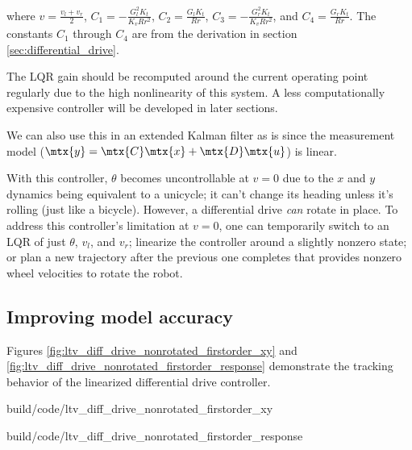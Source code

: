\begin{theorem}
  where $v = \frac{v_l + v_r}{2}$, $C_1 = -\frac{G_l^2 K_t}{K_v R r^2}$,
  $C_2 = \frac{G_l K_t}{Rr}$, $C_3 = -\frac{G_r^2 K_t}{K_v R r^2}$, and
  $C_4 = \frac{G_r K_t}{Rr}$. The constants $C_1$ through $C_4$ are from the
  derivation in section \ref{sec:differential_drive}.

  The LQR gain should be recomputed around the current operating point regularly
  due to the high nonlinearity of this system. A less computationally expensive
  controller will be developed in later sections.
\end{theorem}

We can also use this in an extended Kalman filter as is since the measurement
model ($\mtx{y} = \mtx{C}\mtx{x} + \mtx{D}\mtx{u}$) is linear.

With this \gls{controller}, $\theta$ becomes uncontrollable at $v = 0$ due to
the $x$ and $y$ dynamics being equivalent to a unicycle; it can't change its
heading unless it's rolling (just like a bicycle). However, a differential
drive \textit{can} rotate in place. To address this controller's limitation at
$v = 0$, one can temporarily switch to an LQR of just $\theta$, $v_l$, and
$v_r$; linearize the controller around a slightly nonzero state; or plan a new
trajectory after the previous one completes that provides nonzero wheel
velocities to rotate the robot.

\subsection{Improving model accuracy}

Figures \ref{fig:ltv_diff_drive_nonrotated_firstorder_xy} and
\ref{fig:ltv_diff_drive_nonrotated_firstorder_response} demonstrate the
tracking behavior of the linearized differential drive controller.

\begin{bookfigure}
  \begin{minisvg}{2}{build/code/ltv_diff_drive_nonrotated_firstorder_xy}
    \caption{Linear time-varying differential drive controller x-y plot (first
      order)}
    \label{fig:ltv_diff_drive_nonrotated_firstorder_xy}
  \end{minisvg}
  \hfill
  \begin{minisvg}{2}{build/code/ltv_diff_drive_nonrotated_firstorder_response}
    \caption{Linear time-varying differential drive controller response (first
      order)}
    \label{fig:ltv_diff_drive_nonrotated_firstorder_response}
  \end{minisvg}
\end{bookfigure}

